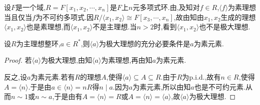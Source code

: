 \documentclass[../../main.tex]{subfiles}%
\begin{document}
\begin{example}
设$F$是一个域,$R = F[x_1,x_2,\cdots,x_n]$是$F$上$n$元多项式环.由,及知对$f \in R$,$\langle f \rangle$为素理想当且仅当$f$为不可约多项式.因$R/\langle x_1,x_2 \rangle \cong F[x_3,\cdots,x_n]$,故由知由$x_1,x_2$生成的理想$\langle x_1,x_2 \rangle$也是素理想,而$\langle x_1,x_2 \rangle$不是主理想.当$n > 2$时,看到$\langle x_1,x_2 \rangle$也不是极大理想.
\end{example}

\begin{theorem}\label{theorem:抽象代数--定理2.8.4}
设$R$为主理想整环,$a \in R^*$,则$\langle a \rangle$为极大理想的充分必要条件是$a$为素元素.
\end{theorem}
\begin{proof}

若$\langle a \rangle$为极大理想,由知$\langle a \rangle$为素理想,再由知$a$为素元素.

反之,设$a$为素元素.若有$R$的理想$A$,使得$\langle a \rangle \subseteq A \subseteq R$.由于$R$为p.i.d.,故有$n \in R$,使得$A = \langle n \rangle$.于是由$a\in \langle n \rangle=nR$得$n \mid a$.因为$a$为素元素,所以由知$a$也是不可约元素.从而$n \sim 1$或$n \sim a$,于是由有$A = \langle n \rangle = R$或$A = \langle n \rangle = \langle a \rangle$,故$\langle a \rangle$为极大理想.

\end{proof}
\end{document}
